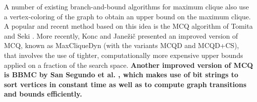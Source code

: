 A number of existing branch-and-bound algorithms for maximum clique
also use a vertex-coloring of the graph to obtain an upper bound on the maximum clique. 
A popular and recent method based on this idea is 
the MCQ algorithm of Tomita and Seki \cite{citeulike:7905505}. 
More recently, Konc and Jane\v{z}i\v{c} \cite{konc2007improved} presented 
an improved version of MCQ, known as MaxCliqueDyn (with the variants MCQD and MCQD+CS), that involves the use of tighter, computationally more expensive upper bounds 
applied on a fraction of the search space. {\bf Another improved version of MCQ is BBMC by San Segundo et al. \cite{SanSegundo}, which makes use of bit strings to sort vertices in constant time as well as to compute graph transitions and bounds efficiently.}


